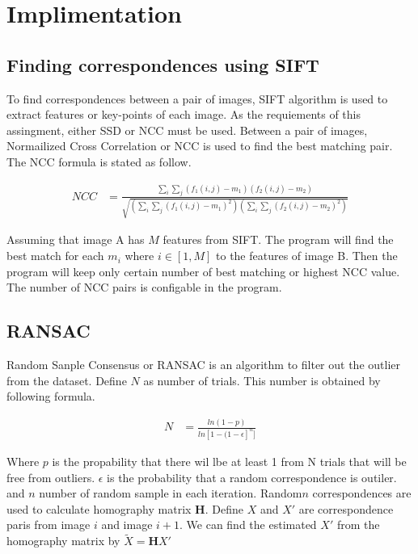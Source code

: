 \documentclass[11pt]{article}
\begin{document}

\section*{Implimentation}

\subsection*{Finding correspondences using SIFT}

To find correspondences between a pair of images, SIFT algorithm is used to extract features or key-points of each image. As the requiements of this assingment, either SSD or NCC must be used. Between a pair of images, Normailized Cross Correlation or NCC is used to find the best matching pair. The NCC formula is stated as follow. 

\begin{align*}
NCC &= \frac{\sum_i{}\sum_j{(f_1(i, j)-m_1)(f_2(i, j)-m_2)}}
{\sqrt{(\sum_i{}\sum_j{(f_1(i, j)-m_1)^2})(\sum_i{}\sum_j{(f_2(i, j)-m_2)^2})}}
\end{align*}

Assuming that image A has $M$ features from SIFT. The program will find the best match for each $m_i$ where $i \in [1, M]$ to the features of image B. Then the program will keep only certain number of best matching or highest NCC value. The number of NCC pairs is configable in the program. 



\subsection*{RANSAC}

Random Sanple Consensus or RANSAC is an algorithm to filter out the outlier from the dataset. Define $N$ as number of trials. This number is obtained by following formula.

\begin{align*}
N &= \frac{ln(1-p)}{ln[1-(1-\epsilon]^n]}
\end{align*}

Where $p$ is the propability that there wil lbe at least 1 from N trials that will be free from outliers. $\epsilon$ is the probability that a random correspondence is outiler. and $n$ number of random sample in each iteration. Random$n$ correspondences are used to calculate homography matrix $\mathbf{H}$. Define $X$ and $X'$ are correspondence paris from image $i$ and image $i+1$. We can find the estimated $X'$ from the homography matrix by $\tilde{X} = \mathbf{H}X'$
\end{document}
